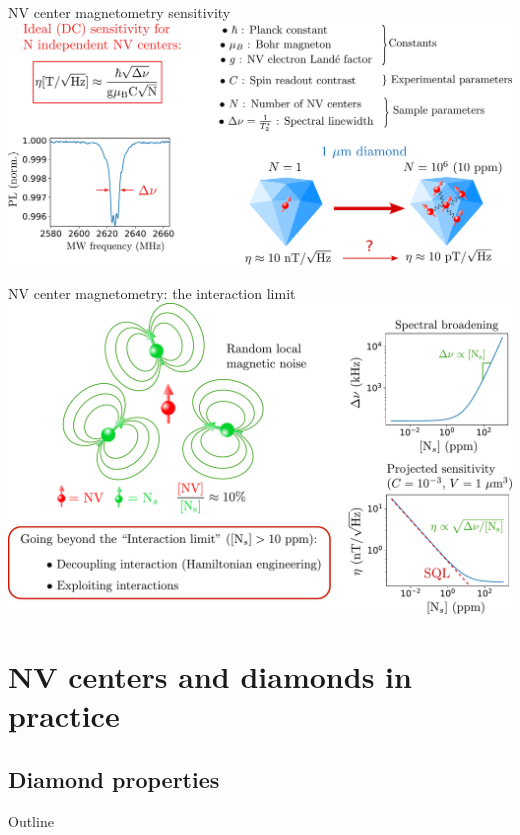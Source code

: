 \documentclass{beamer}
\begin{document}
\begin{frame}{NV center magnetometry sensitivity}
\centering
\includegraphics[width=\textwidth,height=0.85\textheight,keepaspectratio]{Slide_NV_limite_sensi}
\end{frame}

\begin{frame}{NV center magnetometry: the interaction limit}
\centering
\includegraphics[width=\textwidth,height=0.85\textheight,keepaspectratio]{Slide_interaction_limit}
\end{frame}

\section{NV centers and diamonds in practice}
\subsection{Diamond properties}
\begin{frame}{Outline}
\tableofcontents[currentsection]
\end{frame}
\end{document}
